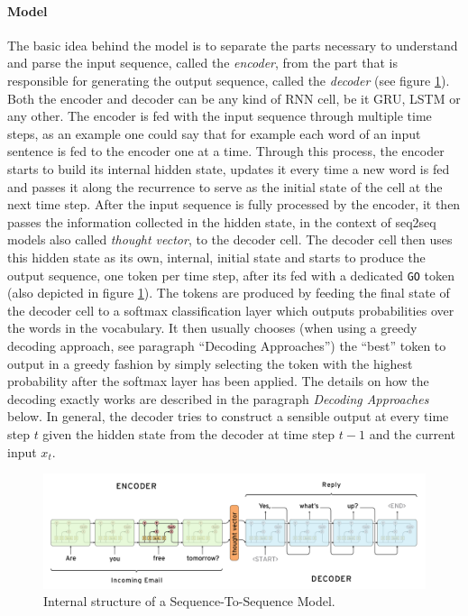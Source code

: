 \paragraph{Model}
The basic idea behind the model is to separate the parts necessary to understand and parse the input sequence, called the \emph{encoder}, from the part that is responsible for generating the output sequence, called the \emph{decoder} (see figure \ref{fundamentals:seq2seq:internal_structure}). Both the encoder and decoder can be any kind of RNN cell, be it GRU, LSTM or any other. The encoder is fed with the input sequence through multiple time steps, as an example one could say that for example each word of an input sentence is fed to the encoder one at a time. Through this process, the encoder starts to build its internal hidden state, updates it every time a new word is fed and passes it along the recurrence to serve as the initial state of the cell at the next time step. After the input sequence is fully processed by the encoder, it then passes the information collected in the hidden state, in the context of seq2seq models also called \emph{thought vector}, to the decoder cell. The decoder cell then uses this hidden state as its own, internal, initial state and starts to produce the output sequence, one token per time step, after its fed with a dedicated \texttt{GO} token (also depicted in figure \ref{fundamentals:seq2seq:internal_structure}). The tokens are produced by feeding the final state of the decoder cell to a softmax classification layer which outputs probabilities over the words in the vocabulary. It then usually chooses (when using a greedy decoding approach, see paragraph ``Decoding Approaches'') the ``best'' token to output in a greedy fashion by simply selecting the token with the highest probability after the softmax layer has been applied. The details on how the decoding exactly works are described in the paragraph \emph{Decoding Approaches} below. In general, the decoder tries to construct a sensible output at every time step $t$ given the hidden state from the decoder at time step $t-1$ and the current input $x_t$.

\begin{figure}[h]
	\label{fundamentals:seq2seq:internal_structure}
	\centering
	\includegraphics[width=14cm]{img/seq2seq_internal}
	\caption{Internal structure of a Sequence-To-Sequence Model.\protect\footnotemark}
\end{figure}

